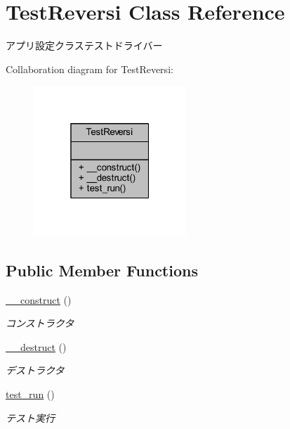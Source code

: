 \hypertarget{class_test_reversi}{}\section{Test\+Reversi Class Reference}
\label{class_test_reversi}


アプリ設定クラステストドライバー  




Collaboration diagram for Test\+Reversi\+:
\nopagebreak
\begin{figure}[H]
\begin{center}
\leavevmode
\includegraphics[width=163pt]{class_test_reversi__coll__graph}
\end{center}
\end{figure}
\subsection*{Public Member Functions}
\begin{DoxyCompactItemize}
\item 
\hyperlink{class_test_reversi_a095c5d389db211932136b53f25f39685}{\+\_\+\+\_\+construct} ()
\begin{DoxyCompactList}\small\item\em コンストラクタ \end{DoxyCompactList}\item 
\hyperlink{class_test_reversi_a421831a265621325e1fdd19aace0c758}{\+\_\+\+\_\+destruct} ()
\begin{DoxyCompactList}\small\item\em デストラクタ \end{DoxyCompactList}\item 
\hyperlink{class_test_reversi_a9b029832cfdf19c0ef36b1f5ef7b7735}{test\+\_\+run} ()
\begin{DoxyCompactList}\small\item\em テスト実行 \end{DoxyCompactList}\end{DoxyCompactItemize}


